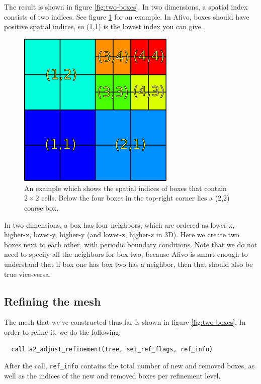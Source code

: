 \documentclass[a4paper, a4wide]{article}
\begin{document}
The result is shown in figure \ref{fig:two-boxes}.
In two dimensions, a spatial index consists of two indices.
See figure \ref{fig:box-indices} for an example.
In Afivo, boxes should have positive spatial indices, so (1,1) is the lowest
index you can give.

\begin{figure}
  \centering
  \includegraphics[width=7.5cm]{figures/box_indices.png}
  \caption{An example which shows the spatial indices of boxes that contain
    $2 \times 2$ cells.
    Below the four boxes in the top-right corner lies a (2,2) coarse box.}
  \label{fig:box-indices}
\end{figure}

In two dimensions, a box has four neighbors, which are ordered as lower-x,
higher-x, lower-y, higher-y (and lower-z, higher-z in 3D).
Here we create two boxes next to each other, with periodic boundary conditions.
Note that we do not need to specify all the neighbors for box two, because Afivo
is smart enough to understand that if box one has box two has a neighbor, then
that should also be true vice-versa.

\subsection{Refining the mesh}
\label{sec:refining-mesh}

The mesh that we've constructed thus far is shown in figure \ref{fig:two-boxes}.
In order to refine it, we do the following:
\begin{lstlisting}
  call a2_adjust_refinement(tree, set_ref_flags, ref_info)
\end{lstlisting}
After the call, \texttt{ref\_info} contains the total number of new and removed
boxes, as well as the indices of the new and removed boxes per refinement level.
\end{document}
